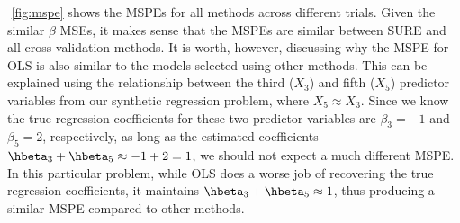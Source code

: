 $ $\newline
\cref{fig:mspe} shows the MSPEs for all methods across different trials. Given the similar $\beta$ MSEs, it makes sense that the MSPEs are similar between SURE and all cross-validation methods. It is worth, however, discussing why the MSPE for OLS is also similar to the models selected using other methods. This can be explained using the relationship between the third ($X_3$) and fifth ($X_5$) predictor variables from our synthetic regression problem, where $X_5\approx X_3$. Since we know the true regression coefficients for these two predictor variables are $\beta_3=-1$ and $\beta_5=2$, respectively, as long as the estimated coefficients $\hbeta_3 + \hbeta_5 \approx -1+2=1$, we should not expect a much different MSPE. In this particular problem, while OLS does a worse job of recovering the true regression coefficients, it maintains $\hbeta_3 + \hbeta_5 \approx 1$, thus producing a similar MSPE compared to other methods.

